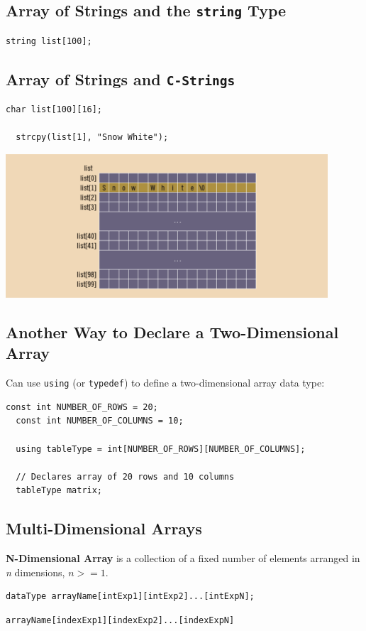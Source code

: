 \documentclass{article}
\begin{document}
\subsection{Array of Strings and the \texttt{string} Type}
\begin{lstlisting}[caption={Array of Strings of 100 Elements}]
  string list[100];
\end{lstlisting}

\subsection{Array of Strings and \texttt{C-Strings}}
\begin{lstlisting}[caption={C-String Array}]
  char list[100][16];

  strcpy(list[1], "Snow White");
\end{lstlisting}

\begin{center}
    \includegraphics[width=0.9\textwidth]{2D-arr-c-str-matrix.png}
\end{center}

\subsection{Another Way to Declare a Two-Dimensional Array}
Can use \texttt{using} (or \texttt{typedef}) to define a two-dimensional array
data type:

\begin{lstlisting}[caption={\texttt{using} Two-Dimensional Array}]
  const int NUMBER_OF_ROWS = 20;
  const int NUMBER_OF_COLUMNS = 10;

  using tableType = int[NUMBER_OF_ROWS][NUMBER_OF_COLUMNS];

  // Declares array of 20 rows and 10 columns
  tableType matrix;
\end{lstlisting}

\subsection{Multi-Dimensional Arrays}
\textbf{N-Dimensional Array} is a collection of a fixed number of elements
arranged in \textit{n} dimensions, $n >= 1$.

\begin{lstlisting}[caption={Multi-Dimensional Array Syntax}]
  dataType arrayName[intExp1][intExp2]...[intExpN];
\end{lstlisting}

\begin{lstlisting}[caption={Accessing a Multi-Dimensional Array Component}]
  arrayName[indexExp1][indexExp2]...[indexExpN]
\end{lstlisting}
\end{document}
